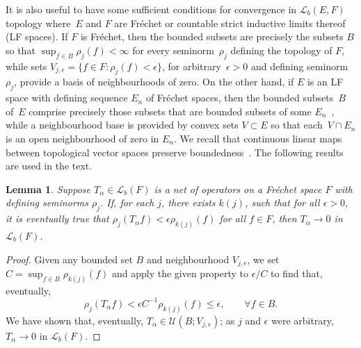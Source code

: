 \documentclass[11pt]{article}
\numberwithin{equation}{section}
\numberwithin{equation}{section}
\newtheorem{Lemma}[Theorem]{Lemma}
\newcommand{\LL}{{\mathcal L}}
\newcommand{\Uf}{{\mathscr U}}
\begin{document}
 It is also useful to have some sufficient conditions for convergence in $\LL_b(E,F)$ topology where~$E$ and $F$ are Fr\'echet or countable strict inductive limits thereof (LF spaces). If $F$ is Fr\'echet, then the bounded subsets are precisely the subsets $B$ so that $\sup_{f\in B} \rho_j(f)<\infty$ for every seminorm~$\rho_j$ defining the topology of $F$, while sets $V_{j,\epsilon}=\{f\in F\colon\rho_j(f)<\epsilon\}$, for arbitrary~$\epsilon>0$ and defining seminorm $\rho_j$, provide a basis of neighbourhoods of zero. On the other hand, if $E$ is an LF space with defining sequence $E_n$ of Fr\'echet spaces, then
 the bounded subsets~$B$ of~$E$ comprise precisely those subsets that are bounded subsets of some $E_n$~\cite[Proposition~14.6]{Treves:TVS}, while a neighbourhood base is provided by convex sets $V\subset E$ so that
 each~$V\cap E_n$ is an open neighbourhood of zero in $E_n$.
 We recall that continuous linear maps between topological vector spaces preserve boundedness~\cite[Proposition~14.2]{Treves:TVS}. The following results are used in the text.
 \begin{Lemma} \label{lem:LbFrechet}
 	Suppose $T_\alpha\in \LL_b(F)$ is a net of operators on a Fr\'echet space $F$ with defining seminorms $\rho_j$. If, for each $j$, there exists $k(j)$,
 	such that for all $\epsilon>0$, it is eventually true that $\rho_j(T_\alpha f)<\epsilon\rho_{k(j)}(f)$ for all $f\in F$, then $T_\alpha\to 0$ in $\LL_b(F)$.
 \end{Lemma}
 \begin{proof}
 	Given any bounded set $B$ and
 	neighbourhood $V_{j,\epsilon}$, we set $C=\sup_{f\in B}\rho_{k(j)}(f)$ and apply the given property to $\epsilon/C$ to find that, eventually,{\samepage
 	\begin{equation*}
 		\rho_j(T_\alpha f)<\epsilon C^{-1} \rho_{k(j)}(f) \le \epsilon, \qquad \forall f\in B.
 	\end{equation*}
 	We have shown that, eventually, $T_\alpha\in \Uf(B;V_{j,\epsilon})$; as $j$ and $\epsilon$ were arbitrary, $T_\alpha\to 0$ in $\LL_b(F)$.}
 \end{proof}
\end{document}
